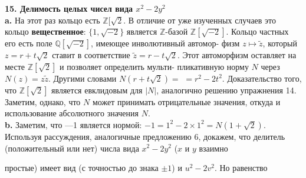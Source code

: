 \documentclass{mai_book}
\begin{document}
\noindent\textbf{15. Делимость целых чисел вида $x^2-2y^2$} \newline 
\\
\hspace*{15pt}\textbf{a.} На этот раз кольцо есть $\mathbb{Z}[\sqrt{2}$. В отличие от уже изученных\linebreak 
слу­чаев это кольцо \textbf{вещественное}: $\{1,\sqrt{-2}\}$ является $\mathbb{Z}$-базой $\mathbb{Z}[\sqrt{-2}]$.\linebreak
Кольцо частных его есть поле $\mathbb{Q}[\sqrt{-2}]$, имеющее инволютивный автомор-\linebreak
физм $z\mapsto\widetilde{z}$, который $z=r+t\sqrt{2}$ ставит в соответствие $\widetilde{z}=r-t\sqrt{2}$. Этот\linebreak
автоморфизм оставляет на месте $\mathbb{Z}[\sqrt{2}]$ и позволяет определить мульти-\linebreak
пликативную норму $N$ через $N(z)=z\widetilde{z}$. Другими словами $N(r+t\sqrt{2})=$\linebreak
$=r^2-2t^2$. Доказательство того, что $\mathbb{Z}[\sqrt{2}]$ является евклидовым для $|N|$,\linebreak
аналогично решению упражнения 14. Заметим, однако, что $N$ может\linebreak
принимать отрицательные значения, откуда и использование абсолют­ного\linebreak
значения $N$.\newline
\\
\hspace*{15pt}\textbf{b.} Заметим, что —1 является нормой: $-1=1^2-2\times1^2=N(1+\sqrt{2})$.\linebreak
Используя рассуждения, аналогичные предложению 6, докажем, что \linebreak
делитель\: (положительный или нет) числа\: вида\: $x^2-2y^2$\: ($x$\: и\: $y$\:\hspace{3pt} взаимно

\pagebreak
%
%
\noindent простые) имеет вид (с точностью до знака $\pm1$) и $u^2-2v^2$. Но равенство\linebreak
\end{document}
